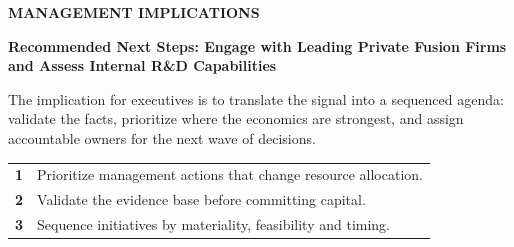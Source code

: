 \documentclass[10pt,a4paper]{article}
\begin{document}
\clearpage
{\textcolor{BOBlue}{\scriptsize\bfseries MANAGEMENT IMPLICATIONS}}\par\vspace{-1pt}
{\Large\sffamily\bfseries\color{BONavy} Recommended Next Steps: Engage with Leading Private Fusion Firms and Assess Internal R\&D Capabilities}\par\vspace{4pt}
{\small The implication for executives is to translate the signal into a sequenced agenda: validate the facts, prioritize where the economics are strongest, and assign accountable owners for the next wave of decisions.}\par
\begin{tabularx}{\linewidth}{p{10mm}Y}
\textcolor{BOBlue}{\bfseries 1} & Prioritize management actions that change resource allocation. \\[5pt]
\textcolor{BOBlue}{\bfseries 2} & Validate the evidence base before committing capital. \\[5pt]
\textcolor{BOBlue}{\bfseries 3} & Sequence initiatives by materiality, feasibility and timing. \\[5pt]
\end{tabularx}
\vspace{6pt}

\vspace{6pt}{\textcolor{BOBlue}{\scriptsize\bfseries EXECUTION ROADMAP}}\par
\begin{center}
\end{center}
\end{document}
